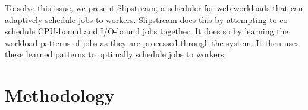 \documentclass{article}
\begin{document}
To solve this issue, we present Slipstream, a scheduler for web workloads that
can adaptively schedule jobs to workers. Slipstream does this by attempting to
co-schedule CPU-bound and I/O-bound jobs together. It does so by learning the
workload patterns of jobs as they are processed through the system. It then uses
these learned patterns to optimally schedule jobs to workers.

\section{Methodology}
\end{document}
